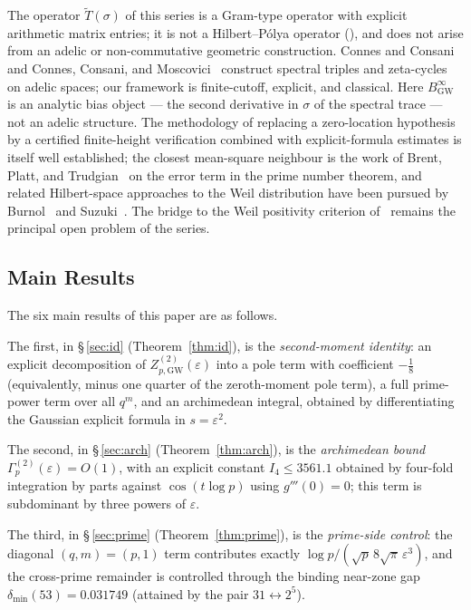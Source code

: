 \documentclass[11pt]{article}
\newcommand{\Tt}{\widetilde{T}}
\newcommand{\BinfGW}{B_{\mathrm{GW}}^{\infty}}   %
\newcommand{\dmin}{\delta_{\min}}           %
\newcommand{\ZtwoGW}{Z_{p,\mathrm{GW}}^{(2)}}   %
\newcommand{\Gp}{\Gamma_p^{(2)}}            %
\begin{document}
The operator $\Tt(\sigma)$ of this series is a Gram-type operator with
explicit arithmetic matrix entries; it is not a Hilbert--P\'olya operator
(\cite{Paper4}), and does not arise from an adelic or non-commutative
geometric construction.
Connes and Consani~\cite{ConnesConsani23} and Connes, Consani, and
Moscovici~\cite{CCM25} construct spectral triples and zeta-cycles on
adelic spaces; our framework is finite-cutoff, explicit, and classical.
Here $\BinfGW$ is an analytic bias object --- the second derivative in
$\sigma$ of the spectral trace --- not an adelic structure.
The methodology of replacing a zero-location hypothesis by a certified
finite-height verification combined with explicit-formula estimates is
itself well established; the closest mean-square neighbour is the work of
Brent, Platt, and Trudgian~\cite{BrentPlattTrudgian20} on the error term
in the prime number theorem, and related Hilbert-space approaches to the
Weil distribution have been pursued by Burnol~\cite{Burnol} and
Suzuki~\cite{Suzuki25}.
The bridge to the Weil positivity criterion of~\cite{Lagarias,Bombieri}
remains the principal open problem of the series.

\subsection{Main Results}

The six main results of this paper are as follows.

The first, in \S\,\ref{sec:id} (Theorem~\ref{thm:id}), is the
\emph{second-moment identity}: an explicit decomposition of
$\ZtwoGW(\varepsilon)$ into a pole term with coefficient $-\tfrac18$
(equivalently, minus one quarter of the zeroth-moment pole term), a full
prime-power term over all $q^m$, and an archimedean integral, obtained by
differentiating the Gaussian explicit formula in $s=\varepsilon^2$.

The second, in \S\,\ref{sec:arch} (Theorem~\ref{thm:arch}), is the
\emph{archimedean bound} $\Gp(\varepsilon)=O(1)$, with an explicit constant
$I_4\le 3561.1$ obtained by four-fold integration by parts against
$\cos(t\log p)$ using $g'''(0)=0$; this term is subdominant by three powers
of $\varepsilon$.

The third, in \S\,\ref{sec:prime} (Theorem~\ref{thm:prime}), is the
\emph{prime-side control}: the diagonal $(q,m)=(p,1)$ term contributes
exactly $\log p/(\sqrt p\,8\sqrt\pi\,\varepsilon^3)$, and the cross-prime
remainder is controlled through the binding near-zone gap
$\dmin(53)=0.031749$ (attained by the pair $31\leftrightarrow 2^5$).
\end{document}
